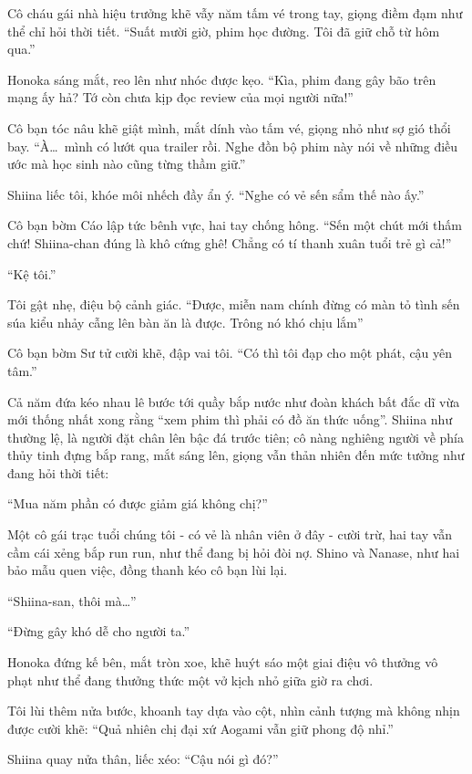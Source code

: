 \documentclass[../main.tex]{subfiles}
\begin{document}
Cô cháu gái nhà hiệu trưởng khẽ vẫy năm tấm vé trong tay, giọng điềm đạm như thể chỉ hỏi thời tiết. ``Suất mười giờ, phim học đường. Tôi đã giữ chỗ từ hôm qua.''

Honoka sáng mắt, reo lên như nhóc được kẹo. ``Kìa, phim đang gây bão trên mạng ấy hả? Tớ còn chưa kịp đọc review của mọi người nữa!''

Cô bạn tóc nâu khẽ giật mình, mắt dính vào tấm vé, giọng nhỏ như sợ gió thổi bay. ``À\dots\ mình có lướt qua trailer rồi. Nghe đồn bộ phim này nói về những điều ước mà học sinh nào cũng từng thầm giữ.''

Shiina liếc tôi, khóe môi nhếch đầy ẩn ý. ``Nghe có vẻ sến sẩm thế nào ấy.''

Cô bạn bờm Cáo lập tức bênh vực, hai tay chống hông. ``Sến một chút mới thấm chứ! Shiina-chan đúng là khô cứng ghê! Chẳng có tí thanh xuân tuổi trẻ gì cả!''

``Kệ tôi.''

Tôi gật nhẹ, điệu bộ cảnh giác. ``Được, miễn nam chính đừng có màn tỏ tình sến súa kiểu nhảy cẫng lên bàn ăn là được. Trông nó khó chịu lắm''

Cô bạn bờm Sư tử cười khẽ, đập vai tôi. ``Có thì tôi đạp cho một phát, cậu yên tâm.''

\ct

Cả năm đứa kéo nhau lê bước tới quầy bắp nước như đoàn khách bất đắc dĩ vừa mới thống nhất xong rằng ``xem phim thì phải có đồ ăn thức uống''. Shiina như thường lệ, là người đặt chân lên bậc đá trước tiên; cô nàng nghiêng người về phía thủy tinh đựng bắp rang, mắt sáng lên, giọng vẫn thản nhiên đến mức tưởng như đang hỏi thời tiết:

``Mua năm phần có được giảm giá không chị?''

Một cô gái trạc tuổi chúng tôi - có vẻ là nhân viên ở đây - cười trừ, hai tay vẫn cầm cái xẻng bắp run run, như thể đang bị hỏi đòi nợ. Shino và Nanase, như hai bảo mẫu quen việc, đồng thanh kéo cô bạn lùi lại.

``Shiina-san, thôi mà\dots''

``Đừng gây khó dễ cho người ta.''

Honoka đứng kế bên, mắt tròn xoe, khẽ huýt sáo một giai điệu vô thưởng vô phạt như thể đang thưởng thức một vở kịch nhỏ giữa giờ ra chơi.

Tôi lùi thêm nửa bước, khoanh tay dựa vào cột, nhìn cảnh tượng mà không nhịn được cười khẽ: ``Quả nhiên chị đại xứ Aogami vẫn giữ phong độ nhỉ.''

Shiina quay nửa thân, liếc xéo: ``Cậu nói gì đó?''
\end{document}
